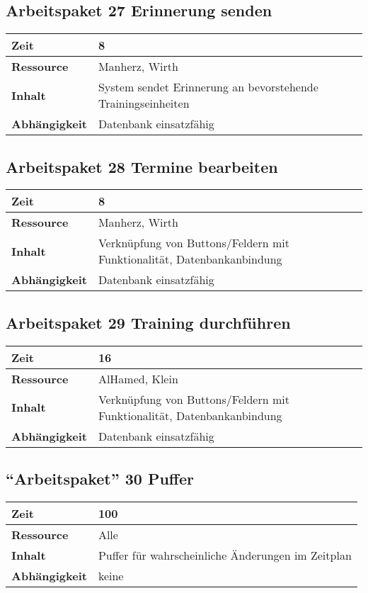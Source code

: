 \documentclass[12pt,a4paper,onecolumn]{article}
\begin{document}
\subsection{Arbeitspaket 27 Erinnerung senden}
\begin{tabularx}{\textwidth}{|l|X|}
\hline
     \textbf{Zeit} & 8\\
     \hline
     \textbf{Ressource} & Manherz, Wirth \\
     \hline
     \textbf{Inhalt} &  System sendet Erinnerung an bevorstehende Trainingseinheiten\\
     \hline
     \textbf{Abhängigkeit} & Datenbank einsatzfähig\\
\hline
\end{tabularx}

\subsection{Arbeitspaket 28 Termine bearbeiten}
\begin{tabularx}{\textwidth}{|l|X|}
\hline
     \textbf{Zeit} & 8\\
     \hline
     \textbf{Ressource} & Manherz, Wirth\\
     \hline
     \textbf{Inhalt} &  Verknüpfung von Buttons/Feldern mit Funktionalität, Datenbankanbindung\\
     \hline
     \textbf{Abhängigkeit} & Datenbank einsatzfähig\\
\hline
\end{tabularx}

\subsection{Arbeitspaket 29 Training durchführen}
\begin{tabularx}{\textwidth}{|l|X|}
\hline
     \textbf{Zeit} & 16\\
     \hline
     \textbf{Ressource} & AlHamed, Klein\\
     \hline
     \textbf{Inhalt} &  Verknüpfung von Buttons/Feldern mit Funktionalität, Datenbankanbindung\\
     \hline
     \textbf{Abhängigkeit} & Datenbank einsatzfähig\\
\hline
\end{tabularx}



\subsection{``Arbeitspaket'' 30 Puffer}
\begin{tabularx}{\textwidth}{|l|X|}
\hline
     \textbf{Zeit} &  100\\
     \hline
     \textbf{Ressource} & Alle\\
     \hline
     \textbf{Inhalt} &  Puffer für wahrscheinliche Änderungen im Zeitplan\\
     \hline
     \textbf{Abhängigkeit} & keine\\
\hline
\end{tabularx}
\end{document}
